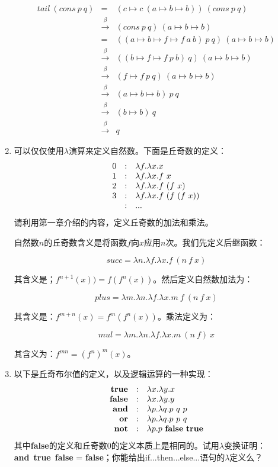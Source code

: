 \documentclass[UTF8]{article}
\begin{document}
\begin{enumerate}
\[
\begin{array}{rcl}
tail\ (cons\ p\ q) & = & (c \mapsto c\ (a \mapsto b \mapsto b))\ (cons\ p\ q) \\
                   & \xrightarrow{\beta} & (cons\ p\ q)\ (a \mapsto b \mapsto b) \\
                   & = & ((a \mapsto b \mapsto f \mapsto f\ a\ b)\ p\ q)\ (a \mapsto b \mapsto b) \\
                   & \xrightarrow{\beta} & ((b \mapsto f \mapsto f\ p\ b)\ q)\ (a \mapsto b \mapsto b) \\
                   & \xrightarrow{\beta} & (f \mapsto f\ p\ q)\ (a \mapsto b \mapsto b) \\
                   & \xrightarrow{\beta} & (a \mapsto b \mapsto b)\ p\ q \\
                   & \xrightarrow{\beta} & (b \mapsto b)\ q \\
                   & \xrightarrow{\beta} & q
\end{array}
\]

\item 可以仅仅使用$\lambda$演算来定义自然数。下面是丘奇数的定义：
\[
\begin{array}{r@{\quad:\quad}l}
0 & \lambda f . \lambda x . x \\
1 & \lambda f . \lambda x . f\ x \\
2 & \lambda f . \lambda x . f\ (f\ x) \\
3 & \lambda f . \lambda x . f\ (f\ (f\ x)) \\
  & ...
\end{array}
\]
请利用第一章介绍的内容，定义丘奇数的加法和乘法。

自然数$n$的丘奇数含义是将函数$f$向$x$应用$n$次。我们先定义后继函数：

\[
succ = \lambda n . \lambda f . \lambda x . f\ (n\ f\ x)
\]

其含义是；$f^{n+1}(x)) = f(f^n(x))$。然后定义自然数加法为：

\[
plus = \lambda m . \lambda n . \lambda f . \lambda x . m\ f\ (n\ f\ x)
\]

其含义是：$f^{m + n}(x) = f^m(f^n(x))$。乘法定义为：

\[
mul = \lambda m . \lambda n . \lambda f . \lambda x . m\ (n\ f)\ x
\]

其含义为：$f^{m n} = (f^n)^m(x)$。

\item 以下是丘奇布尔值的定义，以及逻辑运算的一种实现：
\[
\begin{array}{r@{\quad:\quad}l}
\textbf{true} & \lambda x . \lambda y . x \\
\textbf{false} & \lambda x . \lambda y . y \\
\textbf{and} & \lambda p . \lambda q . p\ q\ p \\
\textbf{or} & \lambda p . \lambda q . p\ p\ q \\
\textbf{not} & \lambda p . p\ \textbf{false}\ \textbf{true}
\end{array}
\]
其中\textbf{false}的定义和丘奇数0的定义本质上是相同的。试用$\lambda$变换证明：\textbf{and}\ \textbf{true}\ \textbf{false} = \textbf{false}；你能给出if...then...else...语句的$\lambda$定义么？


\end{enumerate}
\end{document}
